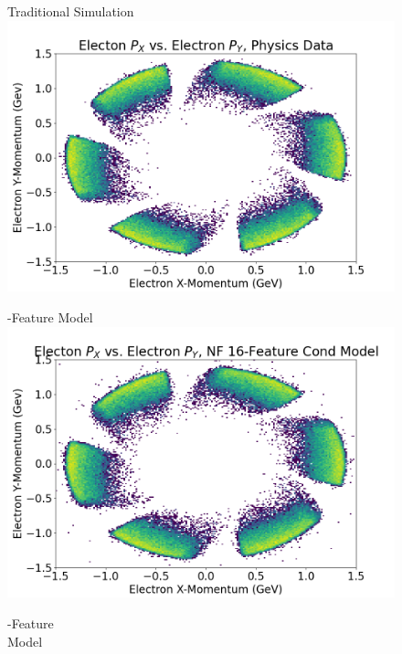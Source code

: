\begin{figure}[htb]
    \centering
     \begin{minipage}{0.1323\textwidth}
        \centering
        Traditional Simulation
        \includegraphics[width=.99\textwidth,trim={0 0 0 0},clip]{Chapters/Ch3-Simulations/normalizing_flows/pics/FinalPictures/Hists2D/Electon_P_X_vs_Electron_P_Y,_Physics_Data.png}
        
    \end{minipage}
         \begin{minipage}{0.1323\textwidth}
        -Feature Model
        \includegraphics[width=.99\textwidth,trim={0 0 0 0},clip]{Chapters/Ch3-Simulations/normalizing_flows/pics/FinalPictures/Hists2D/Electon_P_X_vs_Electron_P_Y,_NF_16-Feature_Cond_Model.png}

    \end{minipage}
         \begin{minipage}{0.1323\textwidth}
        -Feature\\ Model
       

\end{minipage}
\end{figure}
